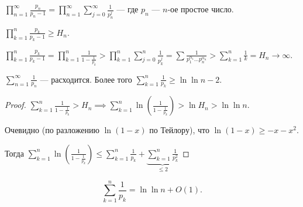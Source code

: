 \begin{example}
    $\prod\limits_{n=1}^\infty \frac{p_n}{p_n - 1} = \prod\limits_{n=1}^\infty \sum\limits_{j=0}^\infty \frac{1}{p_n^j}$ --- где $p_n$ ---  $n$-ое простое число.

     $\prod\limits_{k=1}^n \frac{p_k}{p_k - 1} \ge H_n$.


     $\prod\limits_{k=1}^n \frac{p_k}{p_k - 1} = \prod\limits_{k=1}^n \frac{1}{1-\frac{1}{p_k}} > \prod\limits_{k=1}^n \sum\limits_{j=0}^n \frac{1}{p_k^j} = \sum \frac{1}{p_1^{\alpha_1} \ldots p_n^{\alpha_n}} > \sum\limits_{k=1}^n \frac{1}{k} = H_n \to \infty$.
\end{example}
\begin{theorem}
    $\sum\limits_{n=1}^\infty \frac{1}{p_n}$ --- расходится. Более того $\sum\limits_{k=1}^n \frac{1}{p_k} \ge \ln \ln n - 2$.
\end{theorem}
\begin{proof}
    $\sum\limits_{k=1}^n \frac{1}{1-\frac{1}{p_k}} > H_n \implies \sum\limits_{k=1}^n \ln(\frac{1}{1-\frac{1}{p_k}}) > \ln H_n > \ln \ln n$.

    Очевидно (по разложению $\ln(1 - x)$ по Тейлору), что $\ln(1-x) \ge -x -x^2$.

    Тогда $\sum\limits_{k=1}^n \ln(\frac{1}{1-\frac{1}{p_k}}) \le \sum\limits_{k=1}^n \frac{1}{p_k} + \underbrace{\sum\limits_{k=1}^n \frac{1}{p_k^2}}_{\le 2}$
\end{proof}
\begin{remark}
    \[
    \sum\limits_{k=1}^n \frac{1}{p_k} = \ln \ln n + O(1)
    .\] 
\end{remark}
